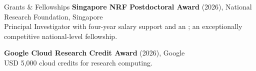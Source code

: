 \begin{rSection}{Grants \& Fellowships}
\noindent \textbf{Singapore NRF Postdoctoral Award} (2026), National Research Foundation, Singapore\\
Principal Investigator with four-year salary support and an ; an exceptionally competitive national-level fellowship.\par\vspace{0.2em}
\noindent \textbf{Google Cloud Research Credit Award} (2026), Google\\
USD 5{,}000 cloud credits for research computing.\par
\end{rSection}
